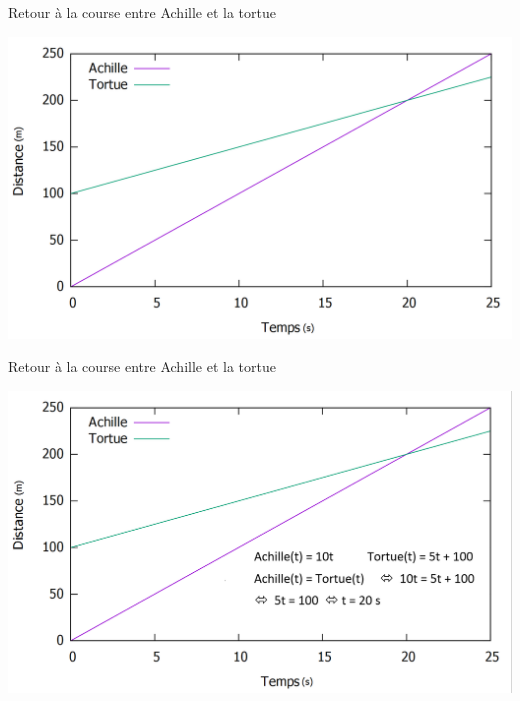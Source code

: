 \documentclass[usenames, dvipsnames, no-framenumber]{beamer}
\begin{document}
\begin{frame}%
Retour à la course entre Achille et la tortue 
\pause
\begin{center}
\includegraphics[scale=0.35]{images/ZAPT2.png}
\end{center}
\end{frame}



\begin{frame}%
Retour à la course entre Achille et la tortue
\begin{center}
\includegraphics[scale=0.35]{images/ZAPT3.png}
\end{center}
\end{frame}
\end{document}
